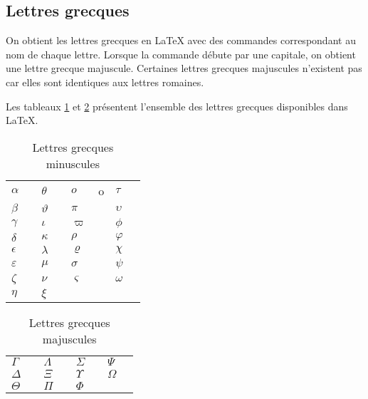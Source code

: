 \subsection{Lettres grecques}
\label{sec:math:symboles:grecques}

On obtient les lettres grecques en {\LaTeX} avec des commandes
correspondant au nom de chaque lettre. Lorsque la commande débute par
une capitale, on obtient une lettre grecque majuscule. Certaines
lettres grecques majuscules n'existent pas car elles sont identiques
aux lettres romaines.

Les tableaux \ref{tab:math:grecques} et \ref{tab:math:Grecques}
présentent l'ensemble des lettres grecques disponibles dans {\LaTeX}.

\begin{table}
  \caption{Lettres grecques minuscules}
  \label{tab:math:grecques}
  \begin{tabularx}{1.0\linewidth}{lXlXlXlX}
    $\alpha$      & \cmd{\alpha}      & $\theta$    & \cmd{\theta} &
    $o$           & o                 & $\tau$      & \cmd{\tau} \\
    $\beta$       & \cmd{\beta}       & $\vartheta$ & \cmd{\vartheta} &
    $\pi$         & \cmd{\pi}         & $\upsilon$  & \cmd{\upsilon} \\
    $\gamma$      & \cmd{\gamma}      & $\iota$     & \cmd{\iota} &
    $\varpi$      & \cmd{\varpi}      & $\phi$      & \cmd{\phi} \\
    $\delta$      & \cmd{\delta}      & $\kappa$    & \cmd{\kappa} &
    $\rho$        & \cmd{\rho}        & $\varphi$   & \cmd{\varphi} \\
    $\epsilon$    & \cmd{\epsilon}    & $\lambda$   & \cmd{\lambda} &
    $\varrho$     & \cmd{\varrho}     & $\chi$      & \cmd{\chi} \\
    $\varepsilon$ & \cmd{\varepsilon} & $\mu$       & \cmd{\mu} &
    $\sigma$      & \cmd{\sigma}      & $\psi$      & \cmd{\psi} \\
    $\zeta$       & \cmd{\zeta}       & $\nu$       & \cmd{\nu} &
    $\varsigma$   & \cmd{\varsigma}   & $\omega$    & \cmd{\omega} \\
    $\eta$        & \cmd{\eta}        & $\xi$       & \cmd{\xi}
  \end{tabularx}
\end{table}

\begin{table}
  \caption{Lettres grecques majuscules}
  \label{tab:math:Grecques}
  \begin{tabularx}{1.0\linewidth}{lXlXlXlX}
    $\Gamma$    & \cmd{\Gamma}   &
    $\Lambda$   & \cmd{\Lambda}  &
    $\Sigma$    & \cmd{\Sigma}   &
    $\Psi$      & \cmd{\Psi}     \\
    $\Delta$    & \cmd{\Delta}   &
    $\Xi$       & \cmd{\Xi}      &
    $\Upsilon$  & \cmd{\Upsilon} &
    $\Omega$    & \cmd{\Omega}   \\
    $\Theta$    & \cmd{\Theta}   &
    $\Pi$       & \cmd{\Pi}      &
    $\Phi$      & \cmd{\Phi}
  \end{tabularx}
\end{table}

